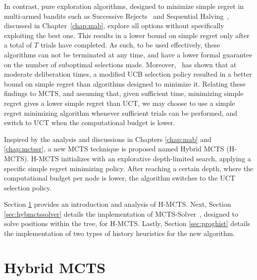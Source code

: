\documentclass{kecsmstr}
\begin{document}
In contrast, pure exploration algorithms, designed to minimize simple regret in multi-armed bandits such as Successive Rejects~ and Sequential Halving~, discussed in Chapter~\ref{chap:mab}, explore all options without specifically exploiting the best one. This results in a lower bound on simple regret only after a total of $T$ trials have completed. As such, to be used effectively, these algorithms can not be terminated at any time, and have a lower formal guarantee on the number of suboptimal selections made. Moreover,~ has shown that at moderate deliberation times, a modified UCB selection policy resulted in a better bound on simple regret than algorithms designed to minimize it. Relating these findings to MCTS, and assuming that, given sufficient time, minimizing simple regret gives a lower simple regret than UCT, we may choose to use a simple regret minimizing algorithm whenever sufficient trials can be performed, and switch to UCT when the computational budget is lower.

Inspired by the analysis and discussions in Chapters \ref{chap:mab} and \ref{chap:mctssr}, a new MCTS technique is proposed named Hybrid MCTS (H-MCTS). H-MCTS initializes with an explorative depth-limited search, applying a specific simple regret minimizing policy. After reaching a certain depth, where the computational budget per node is lower, the algorithm switches to the UCT selection policy. 
\vspace{2 mm}

Section \ref{sec:hybmcts} provides an introduction and analysis of H-MCTS. Next, Section \ref{sec:hybmctssolver} details the implementation of MCTS-Solver~, designed to solve positions within the tree, for H-MCTS. Lastly, Section \ref{sec:proghist} details the implementation of two types of history heuristics for the new algorithm.

\section{Hybrid MCTS}
\label{sec:hybmcts}
\end{document}
